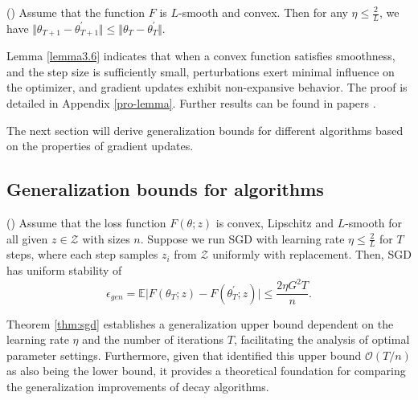 \begin{lemma}{\rm (\citet[Lemma 3.6]{hardt2016train})}
\label{lemma3.6}
Assume that the function $F$ is $L$-smooth and convex. Then for any $\eta \leq \frac{2}{L}$, we have $\Vert \theta_{T+1}-\theta_{T+1}^{\prime} \Vert \leq \Vert \theta_{T}-\theta_{T}^{\prime}\Vert.$
\end{lemma}

\begin{remark}
Lemma \ref{lemma3.6} indicates that when a convex function satisfies smoothness, and the step size is sufficiently small, perturbations exert minimal influence on the optimizer, and gradient updates exhibit non-expansive behavior. The proof is detailed in Appendix \ref{pro-lemma}. Further results can be found in papers \citep{hardt2016train,xiao2022stability}.    
\end{remark}

The next section will derive generalization bounds for different algorithms based on the properties of gradient updates.

\subsection{Generalization bounds for algorithms}

\begin{lemma}{\rm (\citet[Theorem 3.8]{hardt2016train})}\label{thm:sgd}
Assume that the loss function $F(\theta;z)$ is convex, Lipschitz and $L$-smooth for all given $z\in\mathcal{Z}$ with sizes $n$. Suppose we run SGD with learning rate $\eta \leq \frac{2}{L}$ for $T$ steps, where each step samples $z_i$ from $\mathcal{Z}$ uniformly with replacement. Then, SGD has uniform stability of
\begin{equation}
  \epsilon_{gen} = \mathbb{E}\vert F(\theta_T;z)-F(\theta^{\prime}_T;z)\vert \leq \frac{2\eta G^2 T}{n}.
 \end{equation}
\end{lemma}

\begin{remark}
Theorem \ref{thm:sgd} establishes a generalization upper bound dependent on the learning rate $\eta$ and the number of iterations $T$, facilitating the analysis of optimal parameter settings. Furthermore, given that \citet{pmlr-v180-zhang22b} identified this upper bound $\mathcal{O}(T/n)$ as also being the lower bound, it provides a theoretical foundation for comparing the generalization improvements of decay algorithms.    
\end{remark}

